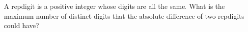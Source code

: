 A repdigit is a positive integer whose digits are all the same. What is the maximum number of distinct digits that the absolute difference of two repdigits could have?
